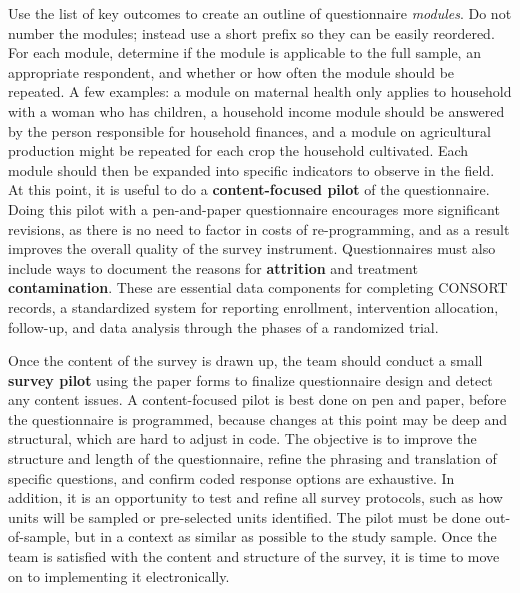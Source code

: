 Use the list of key outcomes to create an outline of questionnaire \textit{modules}.
Do not number the modules; instead use a short prefix so they can be easily reordered.
For each module, determine if the module is applicable to the full sample,
an appropriate respondent, and whether or how often the module should be repeated.
A few examples: a module on maternal health only applies to household with a woman who has children,
a household income module should be answered by the person responsible for household finances,
and a module on agricultural production might be repeated for each crop the household cultivated.
Each module should then be expanded into specific indicators to observe in the field.
At this point, it is useful to do a  \textbf{content-focused pilot}
of the questionnaire.
Doing this pilot with a pen-and-paper questionnaire encourages more significant revisions,
as there is no need to factor in costs of re-programming,
and as a result improves the overall quality of the survey instrument.
Questionnaires must also include ways to document the reasons for \textbf{attrition} and
treatment \textbf{contamination}.
These are essential data components for completing CONSORT records,
a standardized system for reporting enrollment, intervention allocation, follow-up,
and data analysis through the phases of a randomized trial.\cite{begg1996improving}

Once the content of the survey is drawn up,
the team should conduct a small \textbf{survey pilot}
using the paper forms to finalize questionnaire design and detect any content issues.
A content-focused pilot
is best done on pen and paper, before the questionnaire is programmed,
because changes at this point may be deep and structural, which are hard to adjust in code.
The objective is to improve the structure and length of the questionnaire,
refine the phrasing and translation of specific questions,
and confirm coded response options are exhaustive.
In addition, it is an opportunity to test and refine all survey protocols,
such as how units will be sampled or pre-selected units identified.
The pilot must be done out-of-sample,
but in a context as similar as possible to the study sample.
Once the team is satisfied with the content and structure of the survey,
it is time to move on to implementing it electronically.

